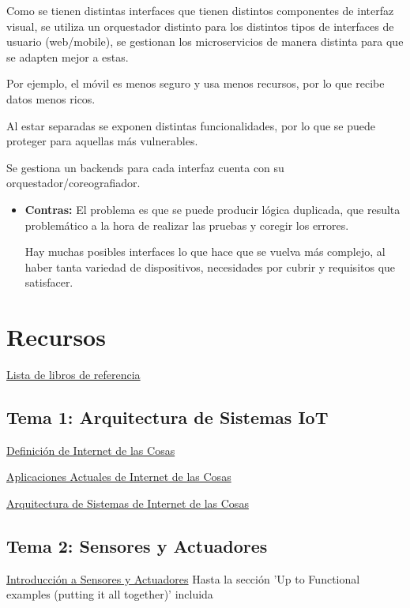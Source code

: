 \documentclass[12pt]{report} %
\begin{document}
Como se tienen distintas interfaces que tienen distintos componentes de interfaz visual, se utiliza un orquestador distinto para los distintos tipos de interfaces de usuario (web/mobile), se gestionan los microservicios de manera distinta para que se adapten mejor a estas.

Por ejemplo, el móvil es menos seguro y usa menos recursos, por lo que recibe datos menos ricos.

Al estar separadas se exponen distintas funcionalidades, por lo que se puede proteger para aquellas más vulnerables.

Se gestiona un backends para cada interfaz cuenta con su orquestador/coreografiador.

\begin{itemize}
	\item \textbf{Contras:} El problema es que se puede producir lógica duplicada, que resulta problemático a la hora de realizar las pruebas y coregir los errores.

	Hay muchas posibles interfaces lo que hace que se vuelva más complejo, al haber tanta variedad de dispositivos, necesidades por cubrir y requisitos que satisfacer.
\end{itemize}	
	
	
	
\chapter{Recursos}
\href{https://learning.oreilly.com/playlists/5a6c045f-e39c-465e-9e7c-60dcbb12aebb}{Lista de libros de referencia}

\section{Tema 1: Arquitectura de Sistemas IoT}
\href{https://learning.oreilly.com/library/view/internet-of-things/9781788470599/a7f866bd-4ac8-47f3-a175-0f10d91a5ce2.xhtml}{Definición de Internet de las Cosas}

\href{https://learning.oreilly.com/library/view/internet-of-things/9781119456742/part04.xhtml\#part}{Aplicaciones Actuales de Internet de las Cosas}

\href{https://learning.oreilly.com/library/view/build-your-own/9781484244982/html/474034_1_En_2_Chapter.xhtml}{Arquitectura de Sistemas de Internet de las Cosas}

\section{Tema 2: Sensores y Actuadores}
\href{https://learning.oreilly.com/library/view/internet-of-things/9781788470599/d39be056-b166-476e-868e-c415e4dfa886.xhtml}{Introducción a Sensores y Actuadores} Hasta la sección 'Up to Functional examples (putting it all together)' incluida
\end{document}
